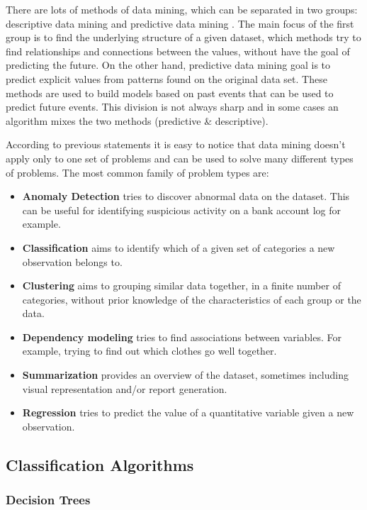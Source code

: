 There are lots of methods of data mining, which can be separated in two groups: descriptive data mining and predictive
data mining \cite{Fayyad96knowledgediscovery}.
The main focus of the first group is to find the underlying structure of a given dataset, which methods try to find relationships and connections
between the values, without have the goal of predicting the future. On the other hand,
predictive data mining goal is to predict explicit values from patterns found on the original data set. These methods are used to build models based on past
events that can be used to predict future events.
This division is not always sharp and in some cases an algorithm mixes the two methods (predictive \& descriptive)\cite{Fayyad96knowledgediscovery}.

According to previous statements it is easy to notice that data mining doesn't apply only to one set of problems and can be used to solve many different types of
problems. The most common family of problem types are:
\begin{itemize}
\item \textbf{Anomaly Detection} tries to discover abnormal data on the dataset. This can be useful for identifying suspicious activity on a bank
account log for example.
\item \textbf{Classification} aims to identify which of a given set of
categories a new observation belongs to.
\item \textbf{Clustering} aims to grouping similar data together, in a finite number of categories, without prior knowledge of
the characteristics of each group or the data.
\item \textbf{Dependency modeling} tries to find associations between variables. For example, trying to find out which clothes go well together.
\item \textbf{Summarization} provides an overview of the dataset, sometimes including visual representation and/or report generation.
\item \textbf{Regression} tries to predict the value of a quantitative variable
given a new observation.
\end{itemize}

\subsection{Classification Algorithms}\label{sec:classification}

\subsubsection{Decision Trees}

